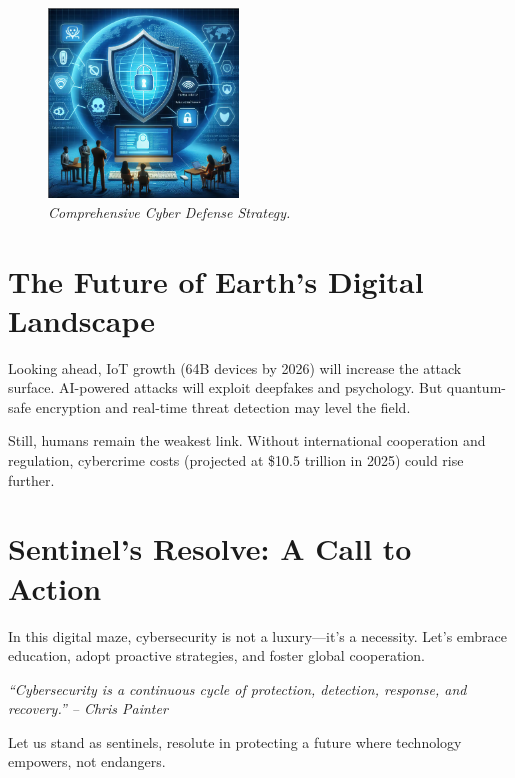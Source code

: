 \documentclass[a4paper,10pt,twocolumn]{memoir}
\newenvironment{magquote}
  {\begin{shaded*}\itshape\small}
  {\end{shaded*}}
\begin{document}
\begin{figure}[h]
  \centering
  \includegraphics[width=0.45\textwidth]{security.png}
  \caption{\textit{Comprehensive Cyber Defense Strategy.}}
\end{figure}

\section*{The Future of Earth’s Digital Landscape}
Looking ahead, IoT growth (64B devices by 2026) will increase the attack surface. AI-powered attacks will exploit deepfakes and psychology. But quantum-safe encryption and real-time threat detection may level the field.

Still, humans remain the weakest link. Without international cooperation and regulation, cybercrime costs (projected at \$10.5 trillion in 2025) could rise further.

\section*{Sentinel’s Resolve: A Call to Action}
In this digital maze, cybersecurity is not a luxury—it’s a necessity. Let’s embrace education, adopt proactive strategies, and foster global cooperation.

\begin{magquote}
``Cybersecurity is a continuous cycle of protection, detection, response, and recovery.'' -- Chris Painter
\end{magquote}

Let us stand as sentinels, resolute in protecting a future where technology empowers, not endangers.

\clearpage



\end{document}
